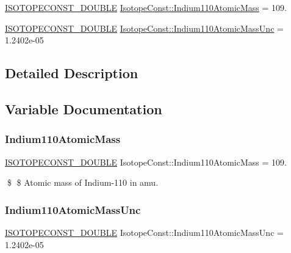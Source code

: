 \begin{DoxyCompactItemize}
\item 
\mbox{\hyperlink{group___isotope_const-_macros_ga8f45a7272ce02c0b4c65c44636ed719a}{I\+S\+O\+T\+O\+P\+E\+C\+O\+N\+S\+T\+\_\+\+D\+O\+U\+B\+LE}} \mbox{\hyperlink{group___isotope_const-_indium-_in110_gad1b206c915763cbe984fa8d3f07a2424}{Isotope\+Const\+::\+Indium110\+Atomic\+Mass}} = 109.
\item 
\mbox{\hyperlink{group___isotope_const-_macros_ga8f45a7272ce02c0b4c65c44636ed719a}{I\+S\+O\+T\+O\+P\+E\+C\+O\+N\+S\+T\+\_\+\+D\+O\+U\+B\+LE}} \mbox{\hyperlink{group___isotope_const-_indium-_in110_ga8f60712ad79cbc160c60aebf50ada38a}{Isotope\+Const\+::\+Indium110\+Atomic\+Mass\+Unc}} = 1.\+2402e-\/05
\end{DoxyCompactItemize}


\subsection{Detailed Description}


\subsection{Variable Documentation}
\mbox{\label{group___isotope_const-_indium-_in110_gad1b206c915763cbe984fa8d3f07a2424}} 
\subsubsection{\texorpdfstring{Indium110\+Atomic\+Mass}{Indium110AtomicMass}}
{\footnotesize\ttfamily \mbox{\hyperlink{group___isotope_const-_macros_ga8f45a7272ce02c0b4c65c44636ed719a}{I\+S\+O\+T\+O\+P\+E\+C\+O\+N\+S\+T\+\_\+\+D\+O\+U\+B\+LE}} Isotope\+Const\+::\+Indium110\+Atomic\+Mass = 109.}

\$ \$ Atomic mass of Indium-\/110 in amu. \mbox{\label{group___isotope_const-_indium-_in110_ga8f60712ad79cbc160c60aebf50ada38a}} 
\subsubsection{\texorpdfstring{Indium110\+Atomic\+Mass\+Unc}{Indium110AtomicMassUnc}}
{\footnotesize\ttfamily \mbox{\hyperlink{group___isotope_const-_macros_ga8f45a7272ce02c0b4c65c44636ed719a}{I\+S\+O\+T\+O\+P\+E\+C\+O\+N\+S\+T\+\_\+\+D\+O\+U\+B\+LE}} Isotope\+Const\+::\+Indium110\+Atomic\+Mass\+Unc = 1.\+2402e-\/05}

